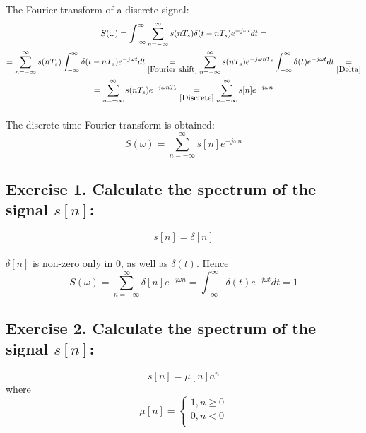 \documentclass[14pt]{article}
\begin{document}
\paragraph{}
The Fourier transform of a discrete signal:
\begin{multline}
	S(\omega) 
	=
	\int_{-\infty}^{\infty} \sum_{n = -\infty}^{\infty} s(n T_s)
		\delta (t - n T_s) e^{-j \omega t} {d}t 
	=\\=
	\sum_{n = -\infty}^{\infty} s(n T_s) \int_{-\infty}^{\infty} 
		\delta (t - n T_s) e^{-j \omega t} {d}t
	\underset{\eqref{Fourier shift}}{=}
	\sum_{n = -\infty}^{\infty} s(n T_s) e^{-j \omega n T_s} 
		\int_{-\infty}^{\infty} \delta (t) e^{-j \omega t} {d}t 
	\underset{\eqref{Delta}}{=}\\=
	\sum_{n = -\infty}^{\infty} s(n T_s) e^{-j \omega n T_s}
	\underset{\eqref{Discrete}}{=}
	\sum_{n = -\infty}^{\infty} s[n] e^{-j \omega n}
\end{multline}

\paragraph{}
The discrete-time Fourier transform is obtained:
\begin{equation}
	S(\omega) 
	=
	\sum_{n = -\infty}^{\infty} s[n] e^{-j \omega n}
\end{equation}

\subsection{Exercise 1. Calculate the spectrum of the signal 
	$ s[n] $:}
\begin{equation}
	s[n]
	=
	\delta[n]
\end{equation}

\paragraph{}
$ \delta[n] $ is non-zero only in 0, as well as $ \delta(t) $. Hence
\begin{equation} \label{Delta DTFT}
	S(\omega) 
	=
	\sum_{n = -\infty}^{\infty} \delta[n] e^{-j \omega n} 
	= 
	\int_{-\infty}^\infty \delta(t) e^{-j \omega t} {d}t 
	=
	1
\end{equation}

\subsection{Exercise 2. Calculate the spectrum of the signal 
	$ s[n] $:}
\begin{equation}
	s[n] 
	=
	\mu[n] a^n
\end{equation}
where
\begin{equation} \label{mu}
	\mu[n]
	=
	\left\{  
	\begin{array}{rcl}  
		1, n \geq 0\\  
		0, n < 0\\  
	\end{array}
	\right.
\end{equation}
\end{document}
